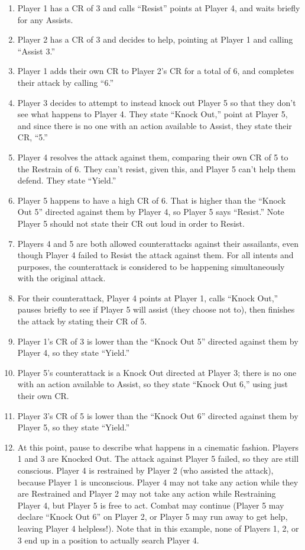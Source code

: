 \documentclass[sheet]{GL2020}
\begin{document}
\begin{enumerate}
	\item Player 1 has a CR of 3 and calls ``Resist'' points at Player 4, and waits briefly for any Assists.
 	\item Player 2 has a CR of 3 and decides to help, pointing at Player 1 and calling ``Assist 3.”
	\item Player 1 adds their own CR to Player 2’s CR for a total of 6, and completes their attack by calling ``6.''
	\item Player 3 decides to attempt to instead knock out Player 5 so that they don’t see what happens to Player 4. They state ``Knock Out,'' point at Player 5, and since there is no one with an action available to Assist, they state their CR, ``5.''
	\item Player 4 resolves the attack against them, comparing their own CR of 5 to the Restrain of 6. They can’t resist, given this, and Player 5 can’t help them defend. They state ``Yield.''
	\item Player 5 happens to have a high CR of 6. That is higher than the ``Knock Out 5'' directed against them by Player 4, so Player 5 says ``Resist.'' Note Player 5 should not state their CR out loud in order to Resist.
	\item Players 4 and 5 are both allowed counterattacks against their assailants, even though Player 4 failed to Resist the attack against them. For all intents and purposes, the counterattack is considered to be happening simultaneously with the original attack.
	\item For their counterattack, Player 4 points at Player 1, calls ``Knock Out,'' pauses briefly to see if Player 5 will assist (they choose not to), then finishes the attack by stating their CR of 5.
	\item Player 1's CR of 3 is lower than the ``Knock Out 5'' directed against them by Player 4, so they state ``Yield.''
	\item Player 5's counterattack is a Knock Out directed at Player 3; there is no one with an action available to Assist, so they state ``Knock Out 6,'' using just their own CR.
	\item Player 3's CR of 5 is lower than the ``Knock Out 6'' directed against them by Player 5, so they state ``Yield.''
	\item At this point, pause to describe what happens in a cinematic fashion. Players 1 and 3 are Knocked Out. The attack against Player 5 failed, so they are still conscious. Player 4 is restrained by Player 2 (who assisted the attack), because Player 1 is unconscious. Player 4 may not take any action while they are Restrained and Player 2 may not take any action while Restraining Player 4, but Player 5 is free to act. Combat may continue (Player 5 may declare ``Knock Out 6'' on Player 2, or Player 5 may run away to get help, leaving Player 4 helpless!). Note that in this example, none of Players 1, 2, or 3 end up in a position to actually search Player 4.
\end{enumerate}
\end{document}
